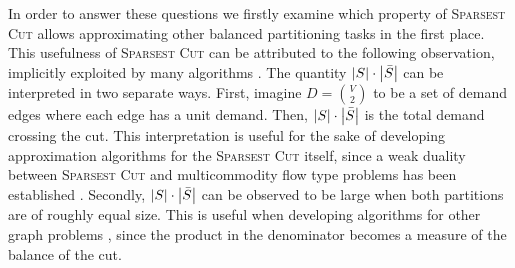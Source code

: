 In order to answer these questions we firstly examine which property of \textsc{Sparsest Cut} allows approximating other balanced partitioning tasks in the first place.
This usefulness of \textsc{Sparsest Cut} can be attributed to the following observation, implicitly exploited by many algorithms \cite{MulticommodityMaxFlowMinCutTheoremsAndTheirUseInDesigningApproximationAlgorithms,AnOlogkApproximateMinCutMaxFlowTheoremAndApproximationAlgorithm,ACostFunctionForSimilarityBasedHierarchicalClustering,ApproximateHierarchicalClusteringViaSparsestCutAndSpreadingMetrics,HierarchicalClusteringObjectiveFunctionsAndAlgorithms,ImprovedApproximationAlgorithmsForMinimumWeightVertexSeparators}.
The quantity $\mathopen{}\left| S \right|\cdot \mathopen{}\left| \bar{S} \right|$ can be interpreted in two separate ways. First, imagine $D=\binom{V}{2}$ to be a set of demand edges where each edge has a unit demand. Then, $\mathopen{}\left| S \right|\cdot \mathopen{}\left| \bar{S} \right|$ is the total demand crossing the cut. This interpretation is useful for the sake of developing approximation algorithms for the \textsc{Sparsest Cut} itself, since a weak duality between \textsc{Sparsest Cut} and multicommodity flow type problems has been established \cite{AnOlogkApproximateMinCutMaxFlowTheoremAndApproximationAlgorithm,MulticommodityMaxFlowMinCutTheoremsAndTheirUseInDesigningApproximationAlgorithms}. Secondly, $\mathopen{}\left| S \right|\cdot \mathopen{}\left| \bar{S} \right|$ can be observed to be large when both partitions are of roughly equal size. This is useful when developing algorithms for other graph problems \cite{ExpanderFlowsGeometricEmbeddingsAndGraphPartitioning,ImprovedApproximationAlgorithmsForMinimumWeightVertexSeparators,MulticommodityMaxFlowMinCutTheoremsAndTheirUseInDesigningApproximationAlgorithms}, since the product in the denominator becomes a measure of the balance of the cut.

